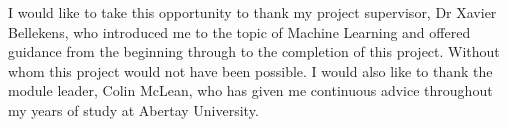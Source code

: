 \begin{acknowledgements}
I would like to take this opportunity to thank my project supervisor, Dr Xavier Bellekens, who introduced me to the topic of Machine Learning and offered guidance from the beginning through to the completion of this project. Without whom this project would not have been possible. I would also like to thank the module leader, Colin McLean, who has given me continuous advice throughout my years of study at Abertay University.
\end{acknowledgements}